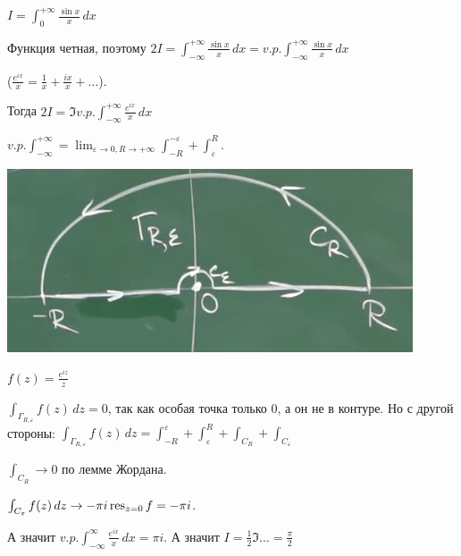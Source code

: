 \begin{example}
    $I = \int_{0}^{+\infty} \frac{\sin x}{x} \, dx$

    Функция четная, поэтому $2I = \int_{-\infty}^{+\infty} \frac{\sin x}{x} \, dx = v.p. \int_{-\infty}^{+\infty} \frac{\sin x}{x} \, dx$

    ($\frac{e^{ix}}{x} = \frac{1}{x} + \frac{ix}{x} + \ldots$).

    Тогда $2I = \Im v.p. \int_{-\infty}^{+\infty} \frac{e^{ix}}{x} \, dx$

    $v.p. \int_{-\infty}^{+\infty} = \lim_{\varepsilon \to 0, R \to +\infty} \int_{-R}^{-\varepsilon} + \int_{\varepsilon}^{R}$.

    \begin{center}
        \includegraphics[width=12cm]{assets/04-functions-of-complex-variables/example-principal-value-integral.png}
    \end{center}

    $f(z) = \frac{e^{iz}}{z}$

    $\int_{\Gamma_{R, \varepsilon}} f(z) \, dz = 0$, так как особая точка только 0, а он не в контуре.
    Но с другой стороны: $\int_{\Gamma_{R, \varepsilon}} f(z) \, dz = \int_{-R}^{\varepsilon} + \int_{\varepsilon}^{R} + \int_{C_R} + \int_{C_{\varepsilon}}$

    $\int_{C_R} \rightarrow 0$ по лемме Жордана.

    $\int_{C_{\varepsilon}} f(z) \, dz \rightarrow -\pi i \operatorname{res}_{z = 0} f = -\pi i$.

    А значит $v.p. \int_{-\infty}^{\infty} \frac{e^{ix}}{x} \, dx = \pi i$. А значит
    $I = \frac{1}{2} \Im \ldots = \frac{\pi}{2}$
\end{example}

\newpage

